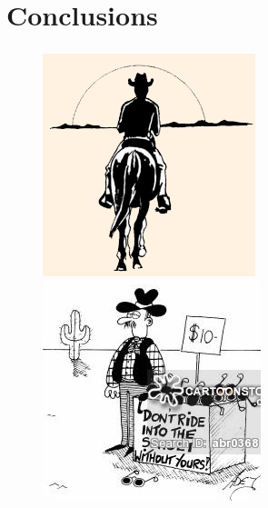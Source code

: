 \documentclass[xcolor=dvipsnames]{beamer}
\begin{document}
\section{Conclusions}
\begin{frame}
	\frametitle{\insertsection}
	
	\begin{center}
	\begin{figure}
	{\includegraphics[height=0.60\textheight]{Pictures/Riding_into_the_sunset}
	\includegraphics[height=0.50\textheight]{Pictures/Riding_into_the_sunset2}}
	\end{figure}
	
	\end{center}
\end{frame}
\end{document}
